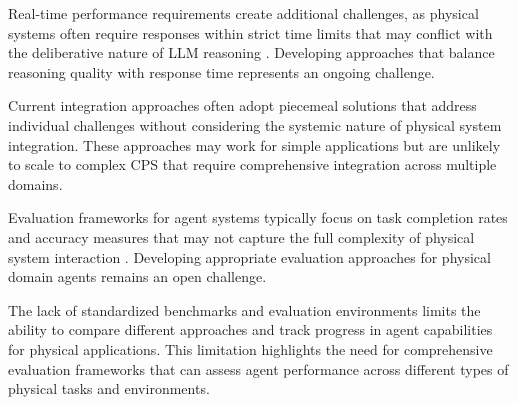 Real-time performance requirements create additional challenges, as physical systems often require responses within strict time limits that may conflict with the deliberative nature of LLM reasoning \cite{buttazzo2011hard}. Developing approaches that balance reasoning quality with response time represents an ongoing challenge.

Current integration approaches often adopt piecemeal solutions that address individual challenges without considering the systemic nature of physical system integration. These approaches may work for simple applications but are unlikely to scale to complex CPS that require comprehensive integration across multiple domains.

Evaluation frameworks for agent systems typically focus on task completion rates and accuracy measures that may not capture the full complexity of physical system interaction \cite{liu2023agentbench}. Developing appropriate evaluation approaches for physical domain agents remains an open challenge.

The lack of standardized benchmarks and evaluation environments limits the ability to compare different approaches and track progress in agent capabilities for physical applications. This limitation highlights the need for comprehensive evaluation frameworks that can assess agent performance across different types of physical tasks and environments.

